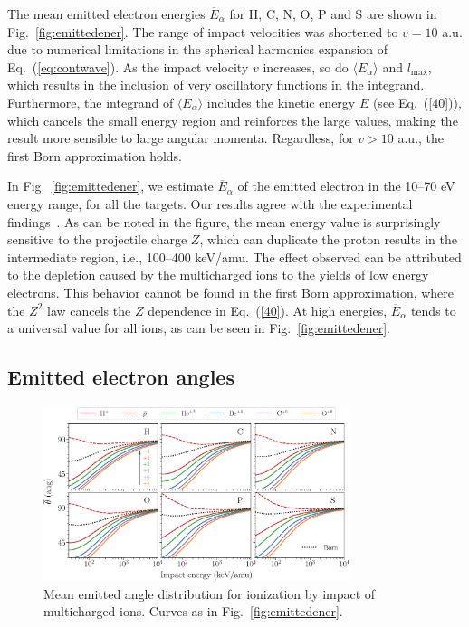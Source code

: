 \documentclass[10pt,showpacs,showkeys,twocolumn]{revtex4}
\begin{document}
The mean emitted electron energies $\overline{E}_{\alpha}$ for H, C, N, 
O, P and S are shown in Fig.~\ref{fig:emittedener}. The range of impact 
velocities was shortened to $v=10$ a.u. due to numerical limitations 
in the spherical harmonics expansion of Eq.~(\ref{eq:contwave}). 
As the impact velocity $v$ increases, so do $\langle E_{\alpha}\rangle$
and $l_{\max}$, which results in the inclusion of very oscillatory 
functions in the integrand. Furthermore, the integrand of
$\langle E_{\alpha}\rangle$ includes the kinetic energy $E$
(see Eq.~(\ref{40})), which cancels the small energy region and 
reinforces the large values, making the result more sensible to large
angular momenta. Regardless, for $v>10$ a.u., the first Born 
approximation holds.

In Fig.~\ref{fig:emittedener}, we estimate $\overline{E}_{\alpha}$ of
the emitted electron in the 10--70 eV energy range,
for all the targets. Our results agree with the 
experimental findings~\cite{surdutovic2018}. As can be noted in the 
figure, the mean energy value is surprisingly sensitive to the 
projectile charge $Z$, which can duplicate the proton results in the 
intermediate region, i.e., 100--400 keV/amu. The effect observed can be 
attributed to the depletion caused by the multicharged ions to the 
yields of low energy electrons. This behavior cannot be found in the 
first Born approximation, where the $Z^2$ law cancels the $Z$ dependence
in Eq.~(\ref{40}). At high energies, $\overline{E}_{\alpha}$ tends to a 
universal value for all ions, as can be seen in Fig.~\ref{fig:emittedener}.


\subsection{Emitted electron angles}
\label{subsec:meanang}

\begin{figure}[t!]
\centering
\includegraphics[width=0.8\textwidth]{figuras/ang_mean.eps}
\caption{Mean emitted angle distribution for ionization by impact of
multicharged ions. Curves as in Fig.~\ref{fig:emittedener}.}
\label{fig:emittedang}
\end{figure} 
\end{document}
